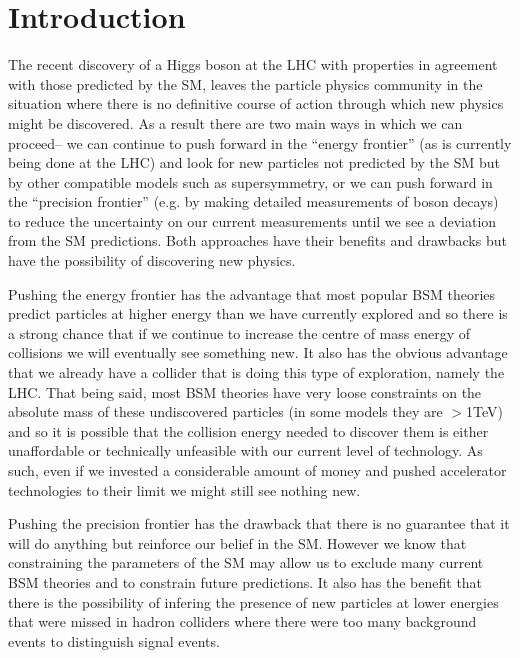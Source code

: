 \chapter{Introduction}
The recent discovery of a Higgs boson at the \ac{LHC} \cite{Aad:2012tfa} with properties in agreement with those predicted by the \ac{SM}, leaves the particle physics community in the situation where there is no definitive course of action through which new physics might be discovered. As a result there are two main ways in which we can proceed-- we can continue to push forward in the ``energy frontier'' (as is currently being done at the \ac{LHC}) and look for new particles not predicted by the \ac{SM} but by other compatible models such as supersymmetry, or we can push forward in the ``precision frontier'' (e.g. by making detailed measurements of boson decays) to reduce the uncertainty on our current measurements until we see a deviation from the \ac{SM} predictions. Both approaches have their benefits and drawbacks but have the possibility of discovering new physics.

Pushing the energy frontier has the advantage that most popular \ac{BSM} theories predict particles at higher energy than we have currently explored and so there is a strong chance that if we continue to increase the centre of mass energy of collisions we will eventually see something new. It also has the obvious advantage that we already have a collider that is doing this type of exploration, namely the \ac{LHC}. That being said, most \ac{BSM} theories have very loose constraints on the absolute mass of these undiscovered particles (in some models \cite{Baer:2012uy} they are ${>}$1TeV) and so it is possible that the collision energy needed to discover them is either unaffordable or technically unfeasible with our current level of technology. As such, even if we invested a considerable amount of money and pushed accelerator technologies to their limit we might still see nothing new.

Pushing the precision frontier has the drawback that there is no guarantee that it will do anything but reinforce our belief in the \ac{SM}. However we know that constraining the parameters of the \ac{SM} may allow us to exclude many current \ac{BSM} theories and to constrain future predictions. It also has the benefit that there is the possibility of infering the presence of new particles at lower energies that were missed in hadron colliders where there were too many background events to distinguish signal events. 

